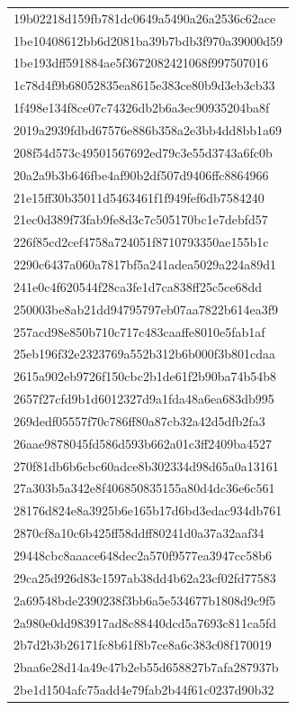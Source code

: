 \begin{tabular}{l}
19b02218d159fb781dc0649a5490a26a2536c62ace \\
1be10408612bb6d2081ba39b7bdb3f970a39000d59 \\
1be193dff591884ae5f3672082421068f997507016 \\
1c78d4f9b68052835ea8615e383ce80b9d3eb3cb33 \\
1f498e134f8ce07c74326db2b6a3ec90935204ba8f \\
2019a2939fdbd67576e886b358a2e3bb4dd8bb1a69 \\
208f54d573c49501567692ed79c3e55d3743a6fc0b \\
20a2a9b3b646fbe4af90b2df507d9406ffc8864966 \\
21e15ff30b35011d5463461f1f949fef6db7584240 \\
21ec0d389f73fab9fe8d3c7c505170bc1e7debfd57 \\
226f85cd2cef4758a724051f8710793350ae155b1c \\
2290c6437a060a7817bf5a241adea5029a224a89d1 \\
241e0c4f620544f28ca3fe1d7ca838ff25c5ce68dd \\
250003be8ab21dd94795797eb07aa7822b614ea3f9 \\
257acd98e850b710c717c483caaffe8010e5fab1af \\
25eb196f32e2323769a552b312b6b000f3b801cdaa \\
2615a902eb9726f150cbc2b1de61f2b90ba74b54b8 \\
2657f27cfd9b1d6012327d9a1fda48a6ea683db995 \\
269dedf05557f70c786ff80a87cb32a42d5dfb2fa3 \\
26aae9878045fd586d593b662a01c3ff2409ba4527 \\
270f81db6b6cbc60adce8b302334d98d65a0a13161 \\
27a303b5a342e8f406850835155a80d4dc36e6c561 \\
28176d824e8a3925b6e165b17d6bd3edac934db761 \\
2870cf8a10c6b425ff58ddff80241d0a37a32aaf34 \\
29448cbc8aaace648dec2a570f9577ea3947cc58b6 \\
29ca25d926d83c1597ab38dd4b62a23cf02fd77583 \\
2a69548bde2390238f3bb6a5e534677b1808d9c9f5 \\
2a980e0dd983917ad8c88440dcd5a7693c811ca5fd \\
2b7d2b3b26171fc8b61f8b7ce8a6c383c08f170019 \\
2baa6e28d14a49c47b2eb55d658827b7afa287937b \\
2be1d1504afc75add4e79fab2b44f61c0237d90b32 \\

\end{tabular}
